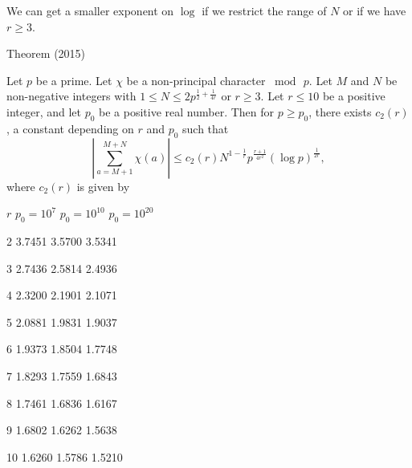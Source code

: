 \par 

 We can get  a smaller exponent on $\log$ if we restrict the range of
 $N$ or if we have $r\ge 3$.
\par 
\begin{thm}{Theorem (2015)}

Let $p$ be a prime. Let $\chi$ be a non-principal character
$\bmod{\,p}$. Let $M$ and $N$ be non-negative integers with $1\le N\le
2 p^{\frac{1}{2} + \frac{1}{4r}}$ or $r\ge 3$. Let $r\le 10$ be a
positive integer, and let $p_0$ be a positive real number. Then for $p
\ge p_0$, there exists $c_2(r)$, a constant depending on $r$ and $p_0$
such that 
$$
\left|\sum_{a=M+1}^{M+N}\chi(a)\right|
\le
 c_2(r) N^{1-\frac{1}{r}} p^{\frac{r+1}{4r^2}}(\log{p})^{\frac{1}{2r}},
$$
where $c_2(r)$ is given by
  
  
  
    
      $r$
      $p_0=10^7$
      $p_0=10^{10}$
      $p_0=10^{20}$
    
  
  
    2
    3.7451
    3.5700
    3.5341
  
  
    3
    2.7436
    2.5814
    2.4936
  
  
    4
    2.3200
    2.1901
    2.1071
  
  
    5
    2.0881
    1.9831
    1.9037
  
  
    6
    1.9373
    1.8504
    1.7748
  
  
    7
    1.8293
    1.7559
    1.6843
  
  
    8
    1.7461
    1.6836
    1.6167
  
  
    9
    1.6802
    1.6262
    1.5638
  
  
    10
    1.6260
    1.5786
    1.5210
  
 

\end{thm}

\par 

